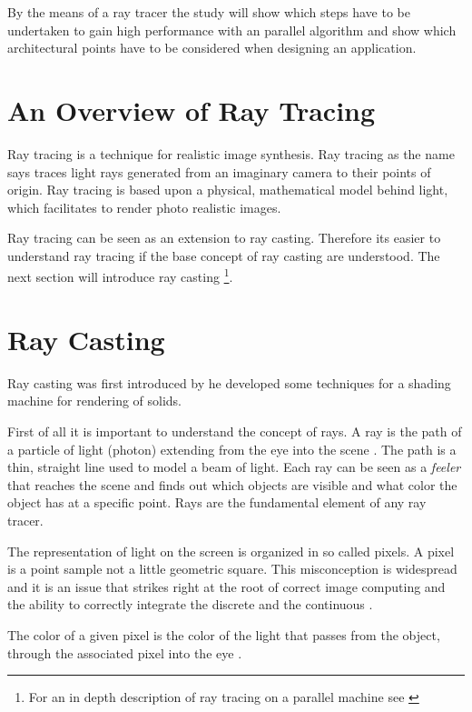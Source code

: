 By the means of a ray tracer the study will show which steps have to be 
undertaken to gain high performance with an parallel algorithm and show which 
architectural points have to be considered when designing an application.

\section{An Overview of Ray Tracing}
Ray tracing is a technique for realistic image synthesis. Ray tracing as the
name says traces light rays generated from an imaginary camera to their points
of origin. Ray tracing is based upon a physical, mathematical model behind
light, which facilitates to render photo realistic images. 

Ray tracing can be seen as an extension to ray casting. Therefore its easier to
understand ray tracing if the base concept of ray casting are understood. The
next section will introduce ray casting \footnote{For an in depth description of
ray tracing on a parallel machine see \citeauthor{citeulike:80546}
\citep{citeulike:80546}}.

\section{Ray Casting}
Ray casting was first introduced by \citeauthor{Appel68} \citep{Appel68} he
developed some techniques for a shading machine for rendering of solids.

First of all it is important to understand the concept of rays. A ray is the
path of a particle of light (photon) extending from the eye into the
scene \citep{Glassner289}. The path is a thin, straight line used to model a beam
of light. Each ray can be seen as a \textit{feeler} that reaches the 
scene and finds out which objects are visible and what color the object has at a 
specific point. Rays are the fundamental element of any ray tracer.

The representation of light on the screen is organized in so called pixels.
A pixel is a point sample not a little geometric square. This misconception
is widespread and it is an issue that strikes right at the root of correct
image computing and the ability to correctly integrate the discrete and the
continuous \citep{AlvyRaySmith95}.

The color of a given pixel is the color of the light that passes from the
object, through the associated pixel into the eye \citep{Hearn94}.

